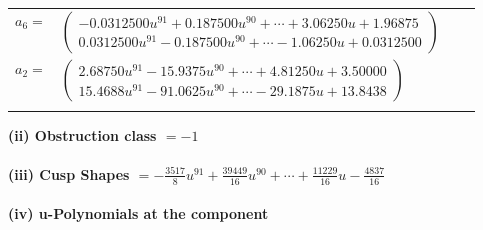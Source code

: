 \documentclass[1p]{elsarticle_modified}
\theoremstyle{definition}
\begin{document}
\begin{tabular}{m{7pt} m{180pt} m{7pt} m{180pt} }
\flushright $a_{6}=$&$\begin{pmatrix}-0.0312500 u^{91}+0.187500 u^{90}+\cdots+3.06250 u+1.96875\\0.0312500 u^{91}-0.187500 u^{90}+\cdots-1.06250 u+0.0312500\end{pmatrix}$ \\
\flushright $a_{2}=$&$\begin{pmatrix}2.68750 u^{91}-15.9375 u^{90}+\cdots+4.81250 u+3.50000\\15.4688 u^{91}-91.0625 u^{90}+\cdots-29.1875 u+13.8438\end{pmatrix}$\\&\end{tabular}
\flushleft \textbf{(ii) Obstruction class $= -1$}\\~\\
\flushleft \textbf{(iii) Cusp Shapes $= -\frac{3517}{8} u^{91}+\frac{39449}{16} u^{90}+\cdots+\frac{11229}{16} u-\frac{4837}{16}$}\\~\\
\newpage\renewcommand{\arraystretch}{1}
\flushleft \textbf{(iv) u-Polynomials at the component}\newline \\
\end{document}
